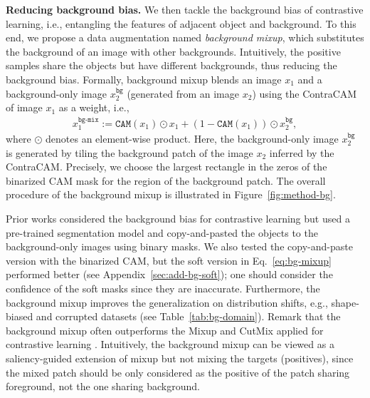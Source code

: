 \documentclass{article}
\begin{document}


\textbf{Reducing background bias.}
We then tackle the background bias of contrastive learning, i.e., entangling the features of adjacent object and background. To this end, we propose a data augmentation named \textit{background mixup}, which substitutes the background of an image with other backgrounds. Intuitively, the positive samples share the objects but have different backgrounds, thus reducing the background bias. Formally, background mixup blends an image $x_1$ and a background-only image $x_2^\texttt{bg}$ (generated from an image $x_2$) using the ContraCAM of image $x_1$ as a weight, i.e.,
\begin{align}
x_1^\texttt{bg-mix} := \texttt{CAM}(x_1) \odot x_1 + (1 - \texttt{CAM}(x_1)) \odot x_2^\texttt{bg},
\label{eq:bg-mixup}
\end{align}
where $\odot$ denotes an element-wise product. Here, the background-only image $x_2^\texttt{bg}$ is generated by tiling the background patch of the image $x_2$ inferred by the ContraCAM. Precisely, we choose the largest rectangle in the zeros of the binarized CAM mask for the region of the background patch. The overall procedure of the background mixup is illustrated in Figure~\ref{fig:method-bg}.

Prior works considered the background bias for contrastive learning \citep{zhao2021distilling,ryali2021leveraging} but used a pre-trained segmentation model and copy-and-pasted the objects to the background-only images using binary masks. We also tested the copy-and-paste version with the binarized CAM, but the soft version in Eq.~\eqref{eq:bg-mixup} performed better (see Appendix~\ref{sec:add-bg-soft}); one should consider the confidence of the soft masks since they are inaccurate. Furthermore, the background mixup improves the generalization on distribution shifts, e.g., shape-biased \citep{geirhos2019imagenet,wang2019learning,hendrycks2020many} and corrupted \citep{hendrycks2019robustness} datasets (see Table~\ref{tab:bg-domain}). Remark that the background mixup often outperforms the Mixup \citep{zhang2018mixup} and CutMix \citep{yun2019cutmix} applied for contrastive learning \citep{lee2021mix}. Intuitively, the background mixup can be viewed as a saliency-guided extension \citep{kim2020puzzle,uddin2021saliencymix} of mixup but not mixing the targets (positives), since the mixed patch should be only considered as the positive of the patch sharing foreground, not the one sharing background.
\end{document}
